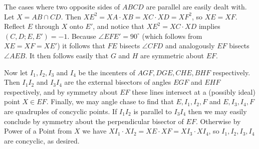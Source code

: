 


\begin{solution}[juckter]
    The cases where two opposite sides of $ABCD$ are parallel are easily dealt
    with. Let $X = AB \cap CD$. Then $XE^2 = XA \cdot XB = XC \cdot XD =
    XF^2$, so $XE = XF$. Reflect $E$ through $X$ onto $E'$, and notice that
    $XE^2 = XC \cdot XD$ implies $(C, D; E, E') = -1$. Because $\angle EFE' =
    90^{\circ}$ (which follows from $XE = XF = XE'$) it follows that $FE$
    bisects $\angle CFD$ and analogously $EF$ bisects $\angle AEB$. It then
    follows easily that $G$ and $H$ are symmetric about $EF$.\\


    Now let $I_1, I_2, I_3$ and $I_4$ be the incenters of $AGF, DGE, CHE, BHF$
    respectively. Then $I_1I_2$ and $I_3I_4$ are the external bisectors of
    angles $EGF$ and $EHF$ respectively, and by symmetry about $EF$ these
    lines intersect at a (possibly ideal) point $X \in EF$. Finally, we may
    angle chase to find that $E, I_1, I_2, F$ and $E, I_3, I_4, F$ are
    quadruples of concyclic points. If $I_1I_2$ is parallel to $I_3I_4$ then
    we may easily conclude by symmetry about the perpendicular bisector of
    $EF$. Otherwise by Power of a Point from $X$ we have $XI_1 \cdot XI_2 = XE
    \cdot XF = XI_3 \cdot XI_4$, so $I_1, I_2, I_3, I_4$ are concyclic, as
    desired.
\end{solution}







